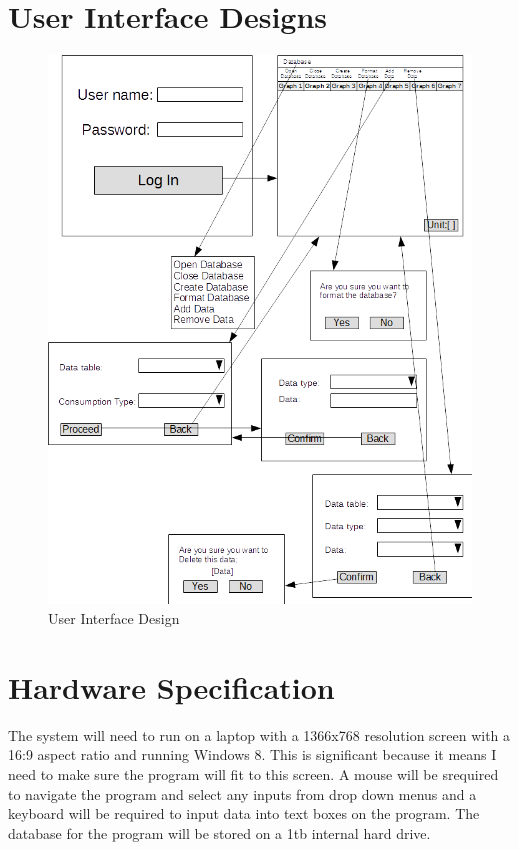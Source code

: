 \section{User Interface Designs}
\begin{figure}[H]
\includegraphics{./design/User Interface Design.png}
\caption{User Interface Design}
\end{figure}

\section{Hardware Specification}
The system will need to run on a laptop with a 1366x768 resolution screen with a 16:9  aspect ratio and running Windows 8. This is significant because it means I need to make sure the program will fit to this screen. A mouse will be srequired to navigate the program and select any inputs from drop down menus and a keyboard will be required to input data into text boxes on the program. The database for the program will be stored on a 1tb internal hard drive.

